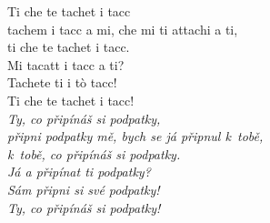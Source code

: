 \medskip

\noindent
Ti che te tachet i tacc \\
tachem i tacc a mi, che mi ti attachi a ti, \\
ti che te tachet i tacc. \\
Mi tacatt i tacc a ti? \\
Tachete ti i tò tacc! \\
Ti che te tachet i tacc! \\
\textit{Ty, co připínáš si podpatky, \\ připni podpatky mě, bych se já připnul k~tobě, \\ k~tobě, co připínáš si podpatky. \\ Já a připínat ti podpatky?  \\ Sám připni si své podpatky!  \\Ty, co připínáš si podpatky!}

\medskip

